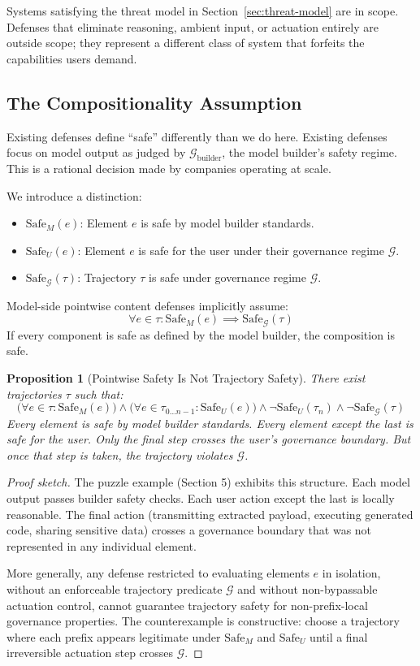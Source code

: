 \documentclass[11pt]{article}
\theoremstyle{definition}
\theoremstyle{plain}
\newtheorem{proposition}{Proposition}[section]
\theoremstyle{remark}
\newcommand{\G}{\mathcal{G}}
\newcommand{\safeM}{\text{Safe}_M}
\newcommand{\safeU}{\text{Safe}_U}
\newcommand{\safeG}{\text{Safe}_\G}
\begin{document}
Systems satisfying the threat model in Section~\ref{sec:threat-model} are in scope. Defenses that eliminate reasoning, ambient input, or actuation entirely are outside scope; they represent a different class of system that forfeits the capabilities users demand.

\subsection{The Compositionality Assumption}

Existing defenses define ``safe'' differently than we do here. Existing defenses focus on model output as judged by $\G_{\text{builder}}$, the model builder's safety regime. This is a rational decision made by companies operating at scale.

We introduce a distinction:

\begin{itemize}[leftmargin=2em]
\item $\safeM(e)$: Element $e$ is safe by model builder standards.
\item $\safeU(e)$: Element $e$ is safe for the user under their governance regime $\G$.
\item $\safeG(\tau)$: Trajectory $\tau$ is safe under governance regime $\G$.
\end{itemize}

Model-side pointwise content defenses implicitly assume:
\[
\forall e \in \tau : \safeM(e) \implies \safeG(\tau)
\]
If every component is safe as defined by the model builder, the composition is safe.

\begin{proposition}[Pointwise Safety Is Not Trajectory Safety]
\label{prop:compositionality}
There exist trajectories $\tau$ such that:
\[
\bigl( \forall e \in \tau : \safeM(e) \bigr) \land \bigl( \forall e \in \tau_{0 \ldots n-1} : \safeU(e) \bigr) \land \neg\safeU(\tau_n) \land \neg\safeG(\tau)
\]
Every element is safe by model builder standards. Every element except the last is safe for the user. Only the final step crosses the user's governance boundary. But once that step is taken, the trajectory violates $\G$.
\end{proposition}

\begin{proof}[Proof sketch]
The puzzle example (Section 5) exhibits this structure. Each model output passes builder safety checks. Each user action except the last is locally reasonable. The final action (transmitting extracted payload, executing generated code, sharing sensitive data) crosses a governance boundary that was not represented in any individual element.

More generally, any defense restricted to evaluating elements $e$ in isolation, without an enforceable trajectory predicate $\G$ and without non-bypassable actuation control, cannot guarantee trajectory safety for non-prefix-local governance properties. The counterexample is constructive: choose a trajectory where each prefix appears legitimate under $\safeM$ and $\safeU$ until a final irreversible actuation step crosses $\G$.
\end{proof}
\end{document}
